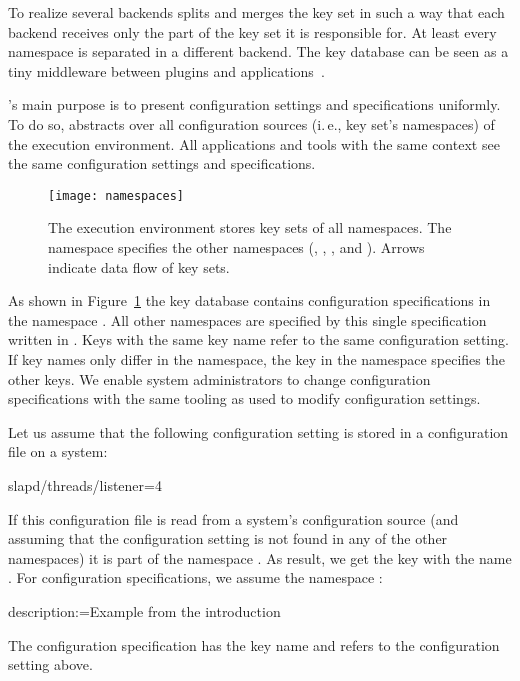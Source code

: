 To realize several backends  splits and merges the key set in such a way that each backend receives only the part of the key set it is responsible for.
At least every namespace is separated in a different backend.
The key database can be seen as a tiny middleware between plugins and applications~\cite{raab2015kps}.

's main purpose is to present configuration settings and specifications uniformly.
To do so,  abstracts over all configuration sources (i.\,e., key set's namespaces) of the execution environment.
All applications and tools with the same context see the same configuration settings and specifications.

\begin{figure}[htp]
\centering
\texttt{[image: namespaces]}
\caption[The namespace in the key database.]{The execution environment stores key sets of all namespaces.
The namespace  specifies the other namespaces (, , , and ).
Arrows indicate data flow of key sets.}
\label{fig:namespaces}
\end{figure}

As shown in Figure~\ref{fig:namespaces} the key database contains configuration specifications in the namespace .
All other namespaces are specified by this single specification written in .
Keys with the same key name refer to the same configuration setting.
If key names only differ in the namespace, the key in the namespace  specifies the other keys.
We enable system administrators to change configuration specifications with the same tooling as used to modify configuration settings.

\begin{example}
Let us assume that the following configuration setting is stored in a configuration file on a system:

\begin{code}[language=CfgElektra]
slapd/threads/listener=4
\end{code}

If this configuration file is read from a system's configuration source (and assuming that the configuration setting is not found in any of the other namespaces) it is part of the namespace .
As result, we get the key with the name .
For configuration specifications, we assume the namespace :

\begin{code}
  description:=Example from the introduction
\end{code}

The configuration specification has the key name  and refers to the configuration setting above.
\end{example}

